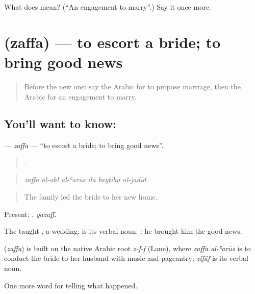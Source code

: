 \begin{tcolorbox}[breakable,colback=teal!4,colframe=teal!35!black,title={Before you move on}]
What does  mean? (\textquotedblleft{}An engagement to marry\textquotedblright{}.) Say it once more.
\end{tcolorbox}
\section[\texorpdfstring{\ar{زف} (zaffa)}{زف (zaffa)}]{ (zaffa) — to escort a bride; to bring good news}

\label{lesson:AR-C306-zaffa}



\begin{quote}
Before the new one: say the Arabic for to propose marriage, then the Arabic for an engagement to marry.
\end{quote}

\subsection*{You'll want to know: }
\textbf{} — \emph{zaffa} — \textquotedblleft{}to escort a bride; to bring good news\textquotedblright{}.

\begin{quote}
     .
\end{quote}

\begin{quote}
\emph{zaffa al-ahl al-ʿarūs ilā baytihā al-jadīd.}
\end{quote}

\begin{quote}
The family led the bride to her new home.
\end{quote}

Present: , \emph{yazuff}.

The taught , a wedding, is its verbal noun.   : he brought him the good news.

\begin{cousinweb}
\textbf{} (\emph{zaffa}) is built on the native Arabic root \emph{z-f-f} (Lane), where \emph{zaffa al-ʿarūs} is to conduct the bride to her husband with music and pageantry; \emph{zifāf} is its verbal noun.
\end{cousinweb}

\begin{grammarlens}[title={What you've built}]
One more word for telling what happened.
\end{grammarlens}


